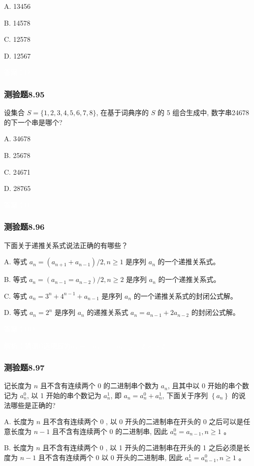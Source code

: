 \documentclass[UTF8, heading=true]{ctexart}
\begin{document}
A. 13456

B. 14578

C. 12578

D. 12567

\textcolor{white}{答案：D}


\subsubsection{测验题8.95}

设集合 $S=\{1,2,3,4,5,6,7,8\}$, 在基于词典序的 $S$ 的 5 组合生成中, 数字串24678的下一个串是哪个?

A. 34678

B. 25678

C. 24671

D. 28765

\textcolor{white}{答案：B}

\subsubsection{测验题8.96}

下面关于递推关系式说法正确的有哪些？

A. 等式 $a_n=\left(a_{n+1}+a_{n-1}\right) / 2, n \geq 1$ 是序列 $a_n$ 的一个递推关系式。

B. 等式 $a_n=\left(a_{n-1}=a_{n-2}\right) / 2, n \geq 2$ 是序列 $a_n$ 的一个递推关系式。

C. 等式 $a_n=3^n+4^{n-1}+a_{n-1}$ 是序列 $a_n$ 的一个递推关系式的封闭公式解。

D. 等式 $a_n=2^n$ 是序列 $a_n$ 的递推关系式 $a_n=a_{n-1}+2 a_{n-2}$ 的封闭公式解。

\textcolor{white}{答案：BD}

\textcolor{white}{解析：猜测B选项应为$a_n=\left(a_{n-1}+a_{n-2}\right) / 2, n \geq 2$}

\subsubsection{测验题8.97}

记长度为 $n$ 且不含有连续两个 0 的二进制串个数为 $a_n$, 且其中以 0 开始的串个数记为 $a_n^0$, 以 1 开始的串个数记为 $a_n^1$, 即 $a_n=a_n^0+a_n^1$, 下面关于序列 $\left\{a_n\right\}$ 的说法哪些是正确的?

A. 长度为 $n$ 且不含有连续两个 0 , 以 0 开头的二进制串在开头的 0 之后可以是任意长度为 $n-1$ 且不含有连续两个 0 的二进制串, 因此 $a_n^0=a_{n-1}, n \geq 1$ 。

B. 长度为 $n$ 且不含有连续两个 0 , 以 1 开头的二进制串在开头的 1 之后必须是长度为 $n-1$ 且不含有连续两个 0 以 0 开头的二进制串, 因此 $a_n^1=a_{n-1}^0, n \geq 1$ 。
\end{document}
